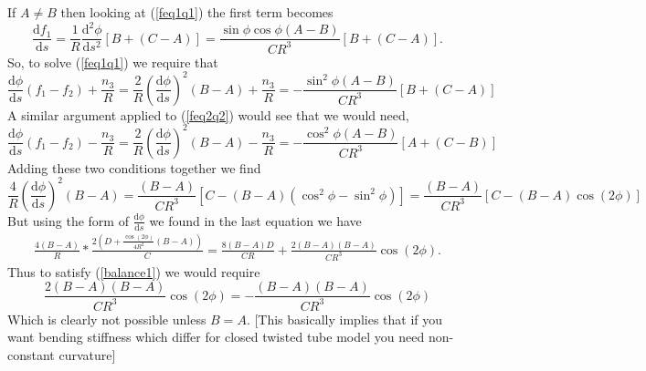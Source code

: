 \documentclass[]{article}
\newcommand{\rmd}{\mathrm{d}}
\newcommand{\deriv}[2]{\frac{\rmd#1}{\rmd #2}}
\newcommand{\derivn}[3]{\frac{\rmd^{#3} #1}{\rmd #2^{#3}}}
\begin{document}
\begin{enumerate}[label=(\alph*)]
{If $A\neq B$ then looking at (\ref{feq1q1}) the first term becomes
\begin{equation}
\deriv{f_1}{s}= \frac{1}{R}\derivn{\phi}{s}{2}\left[B + (C-A)\right] = \frac{\sin\phi\cos\phi(A-B)}{CR^3}\left[B + (C-A)\right].
\end{equation}
So, to solve (\ref{feq1q1}) we require that 
\begin{equation}
\deriv{\phi}{s}(f_1-f_2) +\frac{n_3}{R}=\frac{2}{R}\left(\deriv{\phi}{s}\right)^2(B-A) +\frac{n_3}{R} = - \frac{\sin^2\phi(A-B)}{CR^3}\left[B+ (C-A)\right]
\end{equation}
A similar argument applied to (\ref{feq2q2}) would see that we would need,
\begin{equation}
\deriv{\phi}{s}(f_1-f_2) -\frac{n_3}{R}=\frac{2}{R}\left(\deriv{\phi}{s}\right)^2(B-A) -\frac{n_3}{R} = - \frac{\cos^2\phi(A-B)}{CR^3}\left[A + (C-B)\right]
\end{equation}
Adding these two conditions together we find 
\begin{equation}
\label{balance1}
\frac{4}{R}\left(\deriv{\phi}{s}\right)^2(B-A) =  \frac{(B-A)}{CR^3}\left[C -(B-A)(\cos^2\phi-\sin^2\phi)\right]=  \frac{(B-A)}{CR^3}\left[C -(B-A)\cos(2\phi)\right]
\end{equation}
But using the form of $\deriv{\phi}{s}$ we found in the last equation we have
\begin{align}
\frac{4(B-A)}{R}*\frac{2\left(D+\frac{\cos(2\phi)}{4R^2}(B-A)\right)}{C} =\frac{8(B-A)D}{CR} + \frac{2(B-A)(B-A)}{CR^3}\cos(2\phi).
\end{align}
Thus to satisfy (\ref{balance1}) we would require
\begin{equation}
 \frac{2(B-A)(B-A)}{CR^3}\cos(2\phi)= -\frac{(B-A)(B-A)}{CR^3}\cos(2\phi)
\end{equation}
Which is clearly not possible unless $B=A$.
[This basically implies that if you want bending stiffness which differ for  closed twisted tube model you need non-constant curvature]
}
\end{enumerate}
\end{document}
